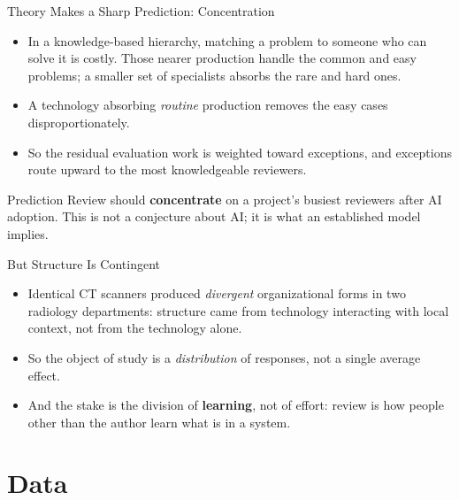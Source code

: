 \begin{frame}{Theory Makes a Sharp Prediction: Concentration}
\begin{itemize}
  \item In a knowledge-based hierarchy, matching a problem to someone who
        can solve it is costly. Those nearer production handle the common
        and easy problems; a smaller set of specialists absorbs the rare
        and hard ones.
  \item A technology absorbing \emph{routine} production removes the easy
        cases disproportionately.
  \item So the residual evaluation work is weighted toward exceptions, and
        exceptions route upward to the most knowledgeable reviewers.
\end{itemize}
\vfill
\begin{alertblock}{Prediction}
  Review should \textbf{concentrate} on a project's busiest reviewers
  after AI adoption. This is not a conjecture about AI; it is what an
  established model implies.
\end{alertblock}
\end{frame}

\begin{frame}{But Structure Is Contingent}
\begin{itemize}
  \item Identical CT scanners produced \emph{divergent} organizational forms
        in two radiology departments: structure came from technology
        interacting with local context, not from the technology alone.
  \item So the object of study is a \emph{distribution} of responses, not a
        single average effect.
  \item And the stake is the division of \textbf{learning}, not of effort:
        review is how people other than the author learn what is in a system.
\end{itemize}
\end{frame}

\section{Data}

